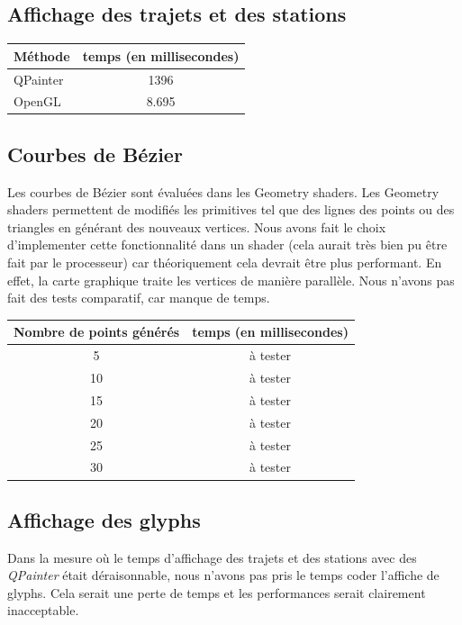 \documentclass[12pt]{article}
\begin{document}
		\subsection{Affichage des trajets et des stations}
		\begin{center}
			\begin{tabular}{| l | c |}
			\hline
			\textbf{Méthode} & \textbf{temps (en millisecondes)} \\ \hline
			QPainter & 1396 \\ \hline
			OpenGL & 8.695 \\ \hline
		    \end{tabular}
	    \end{center}
	    	    
	    \subsection{Courbes de Bézier}
		Les courbes de Bézier sont évaluées dans les Geometry shaders. Les Geometry shaders
		permettent de modifiés les primitives tel que des lignes des points ou des triangles
		en générant des nouveaux vertices. Nous avons fait le choix d'implementer cette 
		fonctionnalité dans un shader (cela aurait très bien pu être fait par le processeur)
		car théoriquement cela devrait être plus performant. En effet, la carte graphique
		traite les vertices de manière parallèle. Nous n'avons pas fait des tests
		comparatif, car manque de temps.\\
	    
		\begin{center}
			\begin{tabular}{| c | c |}
			\hline
			\textbf{Nombre de points générés} & \textbf{temps (en millisecondes)} \\ \hline
			5  &  à tester \\ \hline
			10 &  à tester \\ \hline
			15 &  à tester \\ \hline
			20 &  à tester \\ \hline
			25 &  à tester \\ \hline
			30 &  à tester \\ \hline
		    \end{tabular}
	    \end{center}
	    
		\subsection{Affichage des glyphs}
		Dans la mesure où le temps d'affichage des trajets et des stations avec des \textit{QPainter}
		était déraisonnable, nous n'avons pas pris le temps coder l'affiche de glyphs. Cela serait 
		une perte de temps et les performances serait clairement inacceptable.
		
\end{document}
